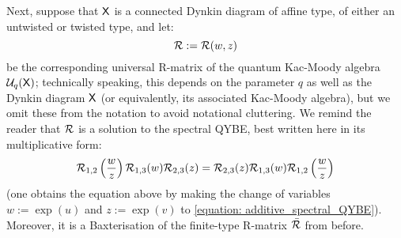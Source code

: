         Next, suppose that $\mathsf{X}$ is a connected Dynkin diagram of affine type, of either an untwisted or twisted type, and let:
            $$\mathcal{R} := \mathcal{R}(w, z)$$
        be the corresponding universal R-matrix of the quantum Kac-Moody algebra $\mathcal{U}_q(\mathsf{X})$; technically speaking, this depends on the parameter $q$ as well as the Dynkin diagram $\mathsf{X}$ (or equivalently, its associated Kac-Moody algebra), but we omit these from the notation to avoid notational cluttering. We remind the reader that $\mathcal{R}$ is a solution to the spectral QYBE, best written here in its multiplicative form:
            \begin{equation} \label{equation: multiplicative_spectral_QYBE}
                \mathcal{R}_{1, 2}\left(\frac{w}{z}\right) \mathcal{R}_{1, 3}(w) \mathcal{R}_{2, 3}(z) = \mathcal{R}_{2, 3}(z) \mathcal{R}_{1, 3}(w) \mathcal{R}_{1, 2}\left(\frac{w}{z}\right)
            \end{equation}
        (one obtains the equation above by making the change of variables $w := \exp(u)$ and $z := \exp(v)$ to \eqref{equation: additive_spectral_QYBE}). Moreover, it is a Baxterisation of the finite-type R-matrix $\bar{\mathcal{R}}$ from before. 

